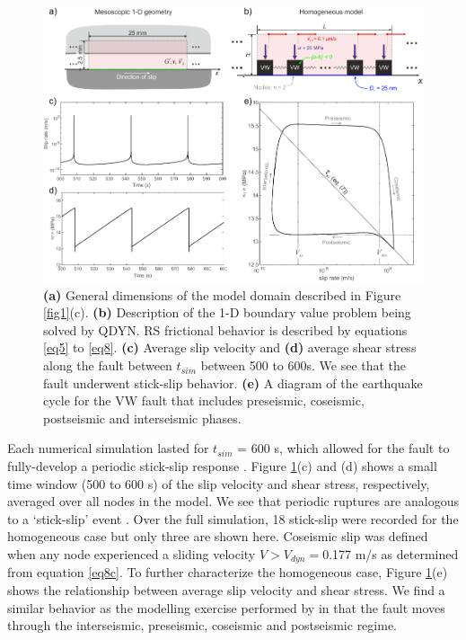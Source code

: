 \documentclass[final,3p, 11pt,authoryear]{elsarticle}
\begin{document}
\begin{figure}
	\centering
	\includegraphics{FIG5.pdf} 
	\caption{\textbf{(a)} General dimensions of the model domain described in Figure \ref{fig1}(c). \textbf{(b)} Description of the 1-D boundary value problem being solved by QDYN.  RS frictional behavior is described by equations \eqref{eq5} to \eqref{eq8}. \textbf{(c)} Average slip velocity and \textbf{(d)} average shear stress along the fault between $t_{sim}$ between 500 to 600s. We see that the fault underwent stick-slip behavior. \textbf{(e)} A diagram of the earthquake cycle for the VW fault that includes preseismic, coseismic, postseismic and interseismic phases.}
	\label{fig5}
\end{figure}

Each numerical simulation lasted for $t_{sim}$ = 600 s, which allowed for the fault to fully-develop a periodic stick-slip response \citep{Hillers2007}.  Figure \ref{fig5}(c) and (d) shows a small time window (500 to 600 s) of the slip velocity and shear stress, respectively, averaged over all nodes in the model.  We see that periodic ruptures are analogous to a `stick-slip' event \citep{Scholz2002}. Over the full simulation, 18 stick-slip were recorded for the homogeneous case but only three are shown here.  Coseismic slip was defined when any node experienced a sliding velocity $V > V_{dyn}=$0.177 m/s as determined from equation \eqref{eq8c}. To further characterize the homogeneous case, Figure \ref{fig5}(e) shows the relationship between average slip velocity and shear stress. We find a similar behavior as the modelling exercise performed by\citet{Ampuero2008} in that the fault moves through the interseismic, preseismic, coseismic and postseismic regime.
\end{document}

